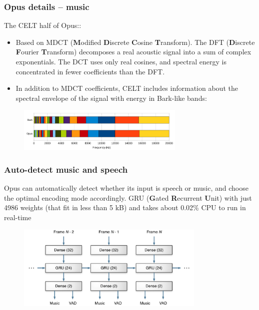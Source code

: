 \documentclass{beamer}
\begin{document}
\begin{frame}
	\frametitle{Opus details -- music}
	The CELT half of Opus::
	\begin{itemize}
		\item
			Based on MDCT (\textbf{M}odified \textbf{D}iscrete \textbf{C}osine \textbf{T}ransform). The DFT (\textbf{D}iscrete \textbf{F}ourier \textbf{T}ransform) decomposes a real acoustic signal into a sum of complex exponentials. The DCT uses only real cosines, and spectral energy is concentrated in fewer coefficients than the DFT.
		\item
			In addition to MDCT coefficients, CELT includes information about the spectral envelope of the signal with energy in Bark-like bands:
	\end{itemize}
	\begin{figure}
	\includegraphics[width=8cm]{./bark.png}
	\end{figure}
\end{frame}


\begin{frame}
	\frametitle{Auto-detect music and speech}
	Opus can automatically detect whether its input is speech or music, and choose the optimal encoding mode accordingly. GRU (\textbf{G}ated \textbf{R}ecurrent \textbf{U}nit) with just 4986 weights (that fit in less than 5 kB) and takes about 0.02\% CPU to run in real-time
	\begin{figure}
	\includegraphics[width=9cm]{./opus_gru.png}
	\end{figure}
\end{frame}
\end{document}
